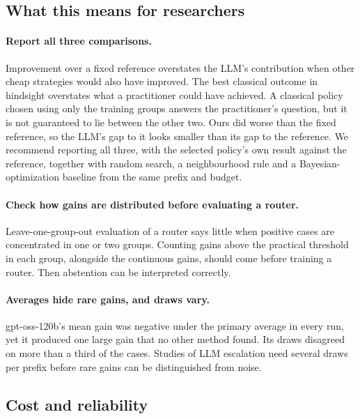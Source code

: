 \subsection{What this means for researchers}

\paragraph{Report all three comparisons.} Improvement over a fixed reference overstates the LLM's contribution when other cheap strategies would also have improved. The best classical outcome in hindsight overstates what a practitioner could have achieved. A classical policy chosen using only the training groups answers the practitioner's question, but it is not guaranteed to lie between the other two. Ours did worse than the fixed reference, so the LLM's gap to it looks smaller than its gap to the reference. We recommend reporting all three, with the selected policy's own result against the reference, together with random search, a neighbourhood rule and a Bayesian-optimization baseline from the same prefix and budget.

\paragraph{Check how gains are distributed before evaluating a router.} Leave-one-group-out evaluation of a router says little when positive cases are concentrated in one or two groups. Counting gains above the practical threshold in each group, alongside the continuous gains, should come before training a router. Then abstention can be interpreted correctly.

\paragraph{Averages hide rare gains, and draws vary.} gpt-oss-120b's mean gain was negative under the primary average in every run, yet it produced one large gain that no other method found. Its draws disagreed on more than a third of the cases. Studies of LLM escalation need several draws per prefix before rare gains can be distinguished from noise.

\subsection{Cost and reliability}

